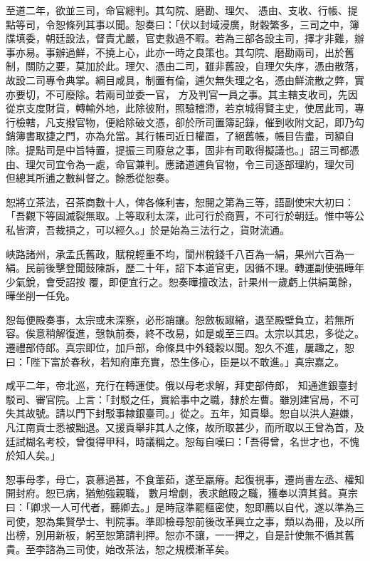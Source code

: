 \begin{pinyinscope}
 至道二年，欲並三司，命官總判。其勾院、磨勘、理欠、
 憑由、支收、行帳、提點等司，令恕條列其事以聞。恕奏曰：「伏以封域浸廣，財穀繁多，三司之中，簿牒填委，朝廷設法，督責尤嚴，官吏救過不暇。若為三部各設主司，擇才非難，辦事亦易。事辦過鮮，不撓上心，此亦一時之良策也。其勾院、磨勘兩司，出於舊制，關防之要，莫加於此。理欠、憑由二司，雖非舊設，自理欠失序，憑由散落，故設二司專令典掌。綱目咸具，制置有倫，逋欠無失理之名，憑由鮮流散之弊，實亦要切，不可廢除。若兩司並委一官，
 方及判官一員之事。其主轄支收司，先因從京支度財貨，轉輸外地，此除彼附，照驗稽滯，若京城得賢主史，使居此司，專行檢轄，凡支撥官物，便給除破文憑，卻於所司置簿記錄，催到收附文記，即乃勾銷簿書取捷之門，亦為允當。其行帳司近日權置，了絕舊帳，帳目告盡，司額自除。提點司是中旨特置，提振三司廢怠之事，固非有司敢得擬議也。」詔三司都憑由、理欠司宜令為一處，命官兼判。應諸道逋負官物，令三司逐部理約，理欠司
 但總其所逋之數糾督之。餘悉從恕奏。



 恕將立茶法，召茶商數十人，俾各條利害，恕閱之第為三等，語副使宋大初曰：「吾觀下等固滅裂無取。上等取利太深，此可行於商賈，不可行於朝廷。惟中等公私皆濟，吾裁損之，可以經久。」於是始為三法行之，貨財流通。



 峽路諸州，承孟氏舊政，賦稅輕重不均，閬州稅錢千八百為一絹，果州六百為一絹。民前後擊登聞鼓陳訴，歷二十年，詔下本道官吏，因循不理。轉運副使張曄年少氣銳，會受詔按
 覆，即便宜行之。恕奏曄擅改法，計果州一歲虧上供絹萬餘，曄坐削一任免。



 恕每便殿奏事，太宗或未深察，必形誚讓。恕斂板踧縮，退至殿壁負立，若無所容。俟意稍解復進，愨執前奏，終不改易，如是或至三四。太宗以其忠，多從之。遷禮部侍郎。真宗即位，加戶部，命條具中外錢穀以聞。恕久不進，屢趣之，恕曰：「陛下富於春秋，若知府庫充實，恐生侈心，臣是以不敢進。」真宗嘉之。



 咸平二年，帝北巡，充行在轉運使。俄以母老求解，拜吏部侍郎，
 知通進銀臺封駁司、審官院。上言：「封駁之任，實給事中之職，隸於左曹。雖別建官局，不可失其故號。請以門下封駁事隸銀臺司。」從之。五年，知貢舉。恕自以洪人避嫌，凡江南貢士悉被黜退。又援貢舉非其人之條，故所取甚少，而所取以王曾為首，及廷試糊名考校，曾復得甲科，時議稱之。恕每自嘆曰：「吾得曾，名世才也，不愧於知人矣。」



 恕事母孝，母亡，哀慕過甚，不食葷茹，遂至羸瘠。起復視事，遷尚書左丞、權知開封府。恕已病，猶勉強親職，
 數月增劇，表求館殿之職，獲奉以濟其貧。真宗曰：「卿求一人可代者，聽卿去。」是時寇準罷樞密使，恕即薦以自代，遂以準為三司使，恕為集賢學士、判院事。準即檢尋恕前後改革興立之事，類以為冊，及以所出榜，別用新板，躬至恕第請判押。恕亦不讓，一一押之，自是計使無不循其舊貴。至李諮為三司使，始改茶法，恕之規模漸革矣。




\end{pinyinscope}
